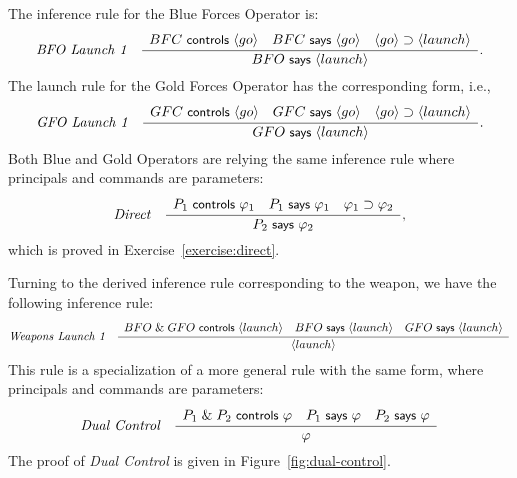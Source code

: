 The inference rule for the Blue Forces Operator is:
\begin{gather*}
  \irule
  {
    \begin{array}{c}
      BFC \controls \action{go} \quad BFC \says \action{go}\quad
      \action{go} \implies \action{launch}\\
    \end{array}
  }
  {BFO \says \action{launch}}
  {BFO Launch 1}.
\end{gather*}
The launch rule for the Gold Forces Operator has the corresponding
form, i.e.,
\begin{gather*}
  \irule
  {
    \begin{array}{c}
      GFC \controls \action{go} \quad GFC \says \action{go}\quad
      \action{go} \implies \action{launch}\\
    \end{array}
  }
  {GFO \says \action{launch}}
  {GFO Launch 1}.
\end{gather*}
Both Blue and Gold Operators are relying the same inference rule where
principals and commands are parameters:
\begin{gather*}
  \irule
  {
    \begin{array}{c}
      P_1 \controls \varphi_1 \quad P_1 \says \varphi_1\quad
      \varphi_1 \implies \varphi_2\\
    \end{array}
  }
  {P_2 \says \varphi_2}
  {Direct},
\end{gather*}
which is proved in Exercise~\ref{exercise:direct}.

Turning to the derived inference rule corresponding to the weapon, we
have the following inference rule:
\begin{gather*}
  \irule
  {
    \begin{array}[h]{c}
    BFO \with GFO \controls \action{launch} \quad BFO \says \action{launch} \quad GFO \says \action{launch} 
    \end{array}
  }
  {\action{launch}}
  {Weapons Launch 1}
\end{gather*}
This rule is a specialization of a more general rule with the same
form, where principals and commands are parameters:
\begin{gather*}
  \irule
  {
    \begin{array}[h]{c}
     P_1 \with P_2 \controls \varphi \quad P_1 \says \varphi \quad P_2 \says \varphi 
    \end{array}
  }
  {\varphi}
  {Dual Control}
\end{gather*}
The proof of \emph{Dual Control} is given in
Figure~\ref{fig:dual-control}.

